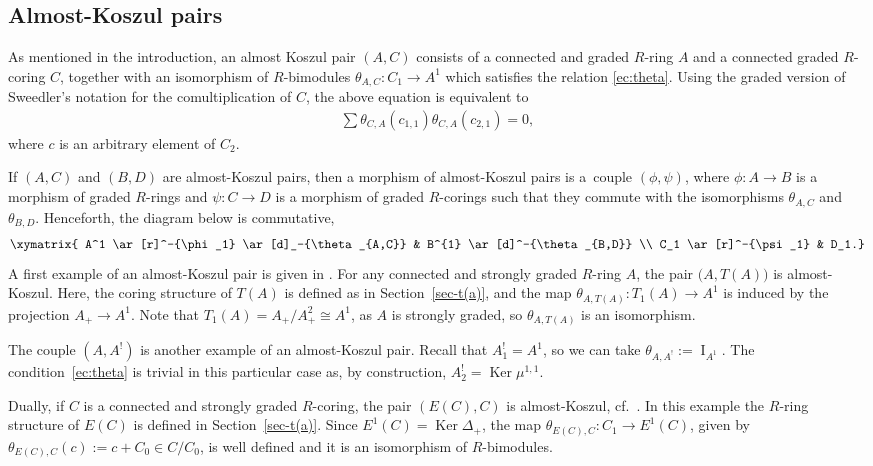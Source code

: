 \documentclass[11pt]{article}
\def\Id{\operatorname{I}}
\DeclareMathOperator{\Ker}{Ker}
\newcommand\rar{\rightarrow}
\renewcommand{\^}[1]{\mbox{$^{\left( #1 \right)}$}}
\renewcommand{\_}[1]{\mbox{$_{\left( #1 \right)}$}}
\numberwithin{equation}{section}
\begin{document}
\subsection{Almost-Koszul pairs} \label{sec:almost}
As mentioned in the introduction, an almost Koszul pair $(A,C)$ consists of a connected and graded $R$-ring $A$ and a connected graded $R$-coring $C$, together with an isomorphism of $R$-bimodules $\theta_{A,C} \colon C_1 \rightarrow A^1$ which satisf\/ies the relation \eqref{ec:theta}. Using the graded version of Sweedler's notation for the comultiplication of $C$, the above equation is equivalent to
\begin{gather} \label{ec:qksz}
	\sum \theta_{C,A}(c_{1,1})\theta_{C,A}(c_{2,1})=0,
\end{gather}
where $c$ is an arbitrary element of $C_2$.

If $(A,C)$ and $(B,D)$ are almost-Koszul pairs, then a morphism of almost-Koszul pairs is a~couple $(\phi,\psi)$, where $\phi\colon A \rar B$ is a morphism of graded $R$-rings and $\psi\colon C \rar D$ is a morphism of graded $R$-corings such that they commute with the isomorphisms $\theta_{A,C}$ and $\theta_{B,D}$. Henceforth, the diagram below is commutative,
\begin{gather*}
 \xymatrix{ A^1 \ar[r]^-{\phi_1} \ar[d]_-{\theta_{A,C}} & B^{1} \ar[d]^-{\theta_{B,D}} \\
C_1 \ar[r]^-{\psi_1} & D_1.}
\end{gather*}
A f\/irst example of an almost-Koszul pair is given in \cite[Proposition 1.8]{jps}. For any connected and strongly graded $R$-ring $A$, the pair $\big(A,T(A)\big)$ is almost-Koszul. Here, the coring structure of $T(A)$ is def\/ined as in Section~\ref{sec-t(a)}, and the map $\theta_{A,T(A)}\colon T_1(A)\to A^1$ is induced by the projection $A_+\to A^1$. Note that $T_1(A)=A_+/A_+^2\cong A^1$, as $A$ is strongly graded, so $\theta_{A,T(A)}$ is an isomorphism.

The couple $(A,A^!)$ is another example of an almost-Koszul pair. Recall that $A^!_1=A^1$, so we can take $\theta_{A,A^!}:=\Id_{A^1}$. The condition~\eqref{ec:theta} is trivial in this particular case as, by construction, $A^!_2=\Ker\mu^{1,1}$.

Dually, if $C$ is a connected and strongly graded $R$-coring, the pair $(E(C),C)$ is almost-Koszul, cf.~\cite[Proposition~1.18]{jps}. In this example the $R$-ring structure of $E(C)$ is def\/ined in Section~\ref{sec-t(a)}. Since $E^1(C)=\Ker\Delta_+$, the map $\theta_{E(C),C}\colon C_1\to E^1(C)$, given by $\theta_{E(C),C}(c):=c+C_0\in C/C_0$, is well def\/ined and it is an isomorphism of $R$-bimodules.
\end{document}
